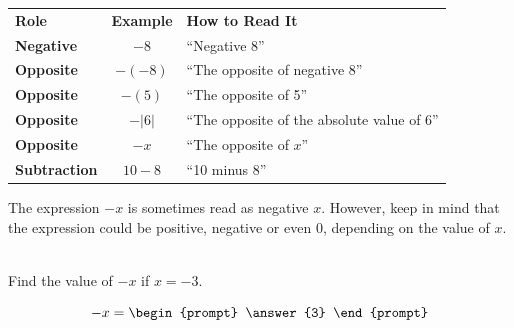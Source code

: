 \documentclass{ximera}[font=12pt]
\begin{document}
\begin{center}
\renewcommand{\arraystretch}{1.7} %
\begin{tabular}{|l|c|l|}

\rowcolor{glaucous!30} %
\large \textbf{Role} & \large \textbf{Example} & \large \textbf{How to Read It} \\

\textbf{Negative} & $-8$ & ``Negative 8'' \\

\textbf{Opposite} & $-(-8)$ & ``The opposite of negative 8'' \\

\textbf{Opposite} & $-(5)$ & ``The opposite of 5'' \\

\textbf{Opposite} & $-|6|$ & ``The opposite of the absolute value of $6$'' \\

\textbf{Opposite} & $-x$ & ``The opposite of $x$'' \\

\textbf{Subtraction} & $10 - 8$ & ``10 minus 8'' \\
\end{tabular}
\end{center}

\begin{remark}
The expression $-x$ is sometimes read as negative $x.$  However, keep in mind that the expression
could be positive, negative or even 0, depending on the value of $x.$  

~ \\[2em]

Find the value of $-x$ if $x = -3.$

\[ -x = \begin{prompt} \answer{3} \end{prompt} \] 



\end{remark}
\end{document}
